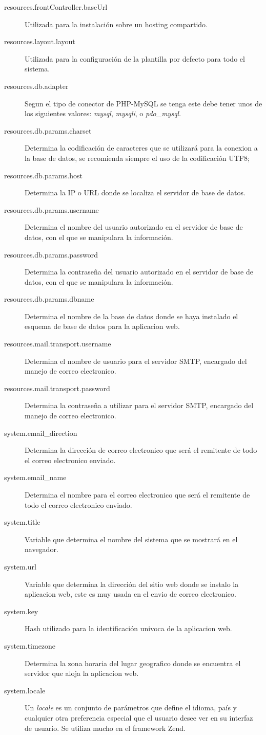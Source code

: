 \begin{description}
\item [resources.frontController.baseUrl] Utilizada para la instalación
sobre un hosting compartido.
\item [resources.layout.layout] Utilizada para la configuración de la
plantilla por defecto para todo el sistema.
\item [resources.db.adapter] Segun el tipo de conector de PHP-MySQL se tenga
este debe tener unos de los siguientes valores: \emph{mysql}, \emph{mysqli}, o
\emph{pdo\_mysql}.
\item [resources.db.params.charset] Determina la codificación de caracteres que
se utilizará para la conexion a la base de datos, se recomienda siempre el uso
de la codificación UTF8;
\item [resources.db.params.host] Determina la IP o URL donde se localiza el
servidor de base de datos.
\item [resources.db.params.username] Determina el nombre del usuario autorizado
en el servidor de base de datos, con el que se manipulara la información.
\item [resources.db.params.password] Determina la contraseña del usuario
autorizado en el servidor de base de datos, con el que se manipulara la
información.
\item [resources.db.params.dbname] Determina el nombre de la base de datos donde
se haya instalado el esquema de base de datos para la aplicacion web.
\item [resources.mail.transport.username] Determina el nombre de usuario para el
servidor SMTP, encargado del manejo de correo electronico.
\item [resources.mail.transport.password] Determina la contraseña a utilizar
para el servidor SMTP, encargado del manejo de correo electronico.
\item [system.email\_direction] Determina la dirección de correo electronico que
será el remitente de todo el correo electronico enviado.
\item [system.email\_name] Determina el nombre para el correo electronico que
será el remitente de todo el correo electronico enviado.
\item [system.title] Variable que determina el nombre del sistema que se
mostrará en el navegador.
\item [system.url] Variable que determina la dirección del sitio web donde se
instalo la aplicacion web, este es muy usada en el envio de correo electronico.
\item [system.key] Hash utilizado para la identificación univoca de la
aplicacion web.
\item [system.timezone] Determina la zona horaria del lugar geografico donde se
encuentra el servidor que aloja la aplicacion web.
\item [system.locale] Un \emph{locale} es un conjunto de parámetros que define
el idioma, país y cualquier otra preferencia especial que el usuario desee ver
en su interfaz de usuario. Se utiliza mucho en el framework Zend.
\end{description}

